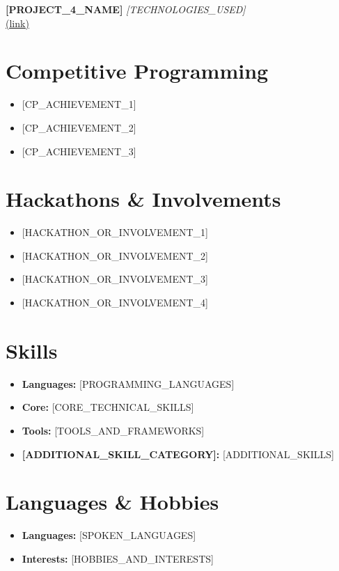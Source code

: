 \documentclass[letterpaper,10.5pt]{article}
\newcommand{\resumeItem}[1]{\item\small{#1}}
\newcommand{\resumeItemListStart}{\begin{itemize}[noitemsep,topsep=0pt,parsep=0pt,partopsep=0pt]}
\newcommand{\resumeItemListEnd}{\end{itemize}}
\begin{document}
\noindent
\textbf{[PROJECT_4_NAME]} \textit{[TECHNOLOGIES_USED]} \\
[PROJECT_4_DESCRIPTION] \href{[PROJECT_4_LINK]}{(link)} \\[6pt]

\section*{Competitive Programming}
\resumeItemListStart
    \resumeItem{[CP_ACHIEVEMENT_1]}
    \resumeItem{[CP_ACHIEVEMENT_2]}
    \resumeItem{[CP_ACHIEVEMENT_3]}
\resumeItemListEnd

\section*{Hackathons \& Involvements}
\resumeItemListStart
  \resumeItem{[HACKATHON_OR_INVOLVEMENT_1]}
  \resumeItem{[HACKATHON_OR_INVOLVEMENT_2]}
  \resumeItem{[HACKATHON_OR_INVOLVEMENT_3]}
  \resumeItem{[HACKATHON_OR_INVOLVEMENT_4]}
\resumeItemListEnd

\section{Skills}
\resumeItemListStart
    \resumeItem{\textbf{Languages:} [PROGRAMMING_LANGUAGES]}
    \resumeItem{\textbf{Core:} [CORE_TECHNICAL_SKILLS]}
    \resumeItem{\textbf{Tools:} [TOOLS_AND_FRAMEWORKS]}
    \resumeItem{\textbf{[ADDITIONAL_SKILL_CATEGORY]:} [ADDITIONAL_SKILLS]}
\resumeItemListEnd

\section{Languages \& Hobbies}
\resumeItemListStart
    \resumeItem{\textbf{Languages:} [SPOKEN_LANGUAGES]}
    \resumeItem{\textbf{Interests:} [HOBBIES_AND_INTERESTS]}
\resumeItemListEnd
\end{document}
